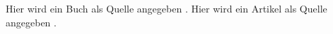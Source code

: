 \documentclass[12pt,a5paper]{article}
\begin{document}
Hier wird ein Buch als Quelle angegeben \cite[2]{Oechsner.2015}. 
Hier wird ein Artikel als Quelle angegeben \cite{Muster.2020}. 
\printbibliography
\end{document}
